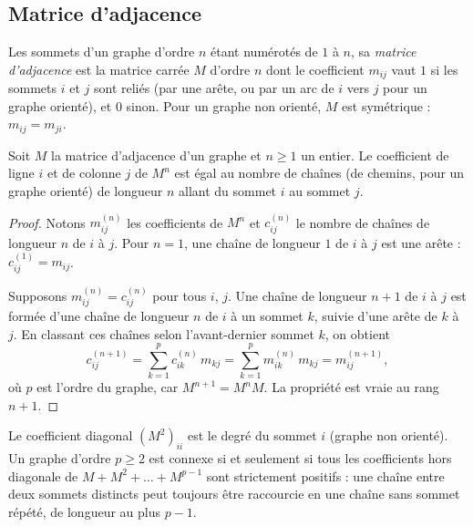 \subsection{Matrice d'adjacence}
\begin{definition}
Les sommets d'un graphe d'ordre $n$ étant numérotés de $1$ à $n$, sa \emph{matrice d'adjacence} est la matrice carrée $M$ d'ordre $n$ dont le coefficient $m_{ij}$ vaut $1$ si les sommets $i$ et $j$ sont reliés (par une arête, ou par un arc de $i$ vers $j$ pour un graphe orienté), et $0$ sinon. Pour un graphe non orienté, $M$ est symétrique : $m_{ij}=m_{ji}$.
\end{definition}
\begin{theorem}
Soit $M$ la matrice d'adjacence d'un graphe et $n\ge1$ un entier. Le coefficient de ligne $i$ et de colonne $j$ de $M^n$ est égal au nombre de chaînes (de chemins, pour un graphe orienté) de longueur $n$ allant du sommet $i$ au sommet $j$.
\end{theorem}
\begin{proof}
Notons $m^{(n)}_{ij}$ les coefficients de $M^n$ et $c^{(n)}_{ij}$ le nombre de chaînes de longueur $n$ de $i$ à $j$. Pour $n=1$, une chaîne de longueur $1$ de $i$ à $j$ est une arête : $c^{(1)}_{ij}=m_{ij}$.\par
Supposons $m^{(n)}_{ij}=c^{(n)}_{ij}$ pour tous $i$, $j$. Une chaîne de longueur $n+1$ de $i$ à $j$ est formée d'une chaîne de longueur $n$ de $i$ à un sommet $k$, suivie d'une arête de $k$ à $j$. En classant ces chaînes selon l'avant-dernier sommet $k$, on obtient
\[c^{(n+1)}_{ij}=\sum_{k=1}^{p}c^{(n)}_{ik}\,m_{kj}=\sum_{k=1}^{p}m^{(n)}_{ik}\,m_{kj}=m^{(n+1)}_{ij},\]
où $p$ est l'ordre du graphe, car $M^{n+1}=M^nM$. La propriété est vraie au rang $n+1$.
\end{proof}
\begin{keypoint}[Conséquences]
Le coefficient diagonal $\left(M^2\right)_{ii}$ est le degré du sommet $i$ (graphe non orienté). Un graphe d'ordre $p\ge2$ est connexe si et seulement si tous les coefficients hors diagonale de $M+M^2+\dots+M^{p-1}$ sont strictement positifs : une chaîne entre deux sommets distincts peut toujours être raccourcie en une chaîne sans sommet répété, de longueur au plus $p-1$.
\end{keypoint}

\mxnewpage
